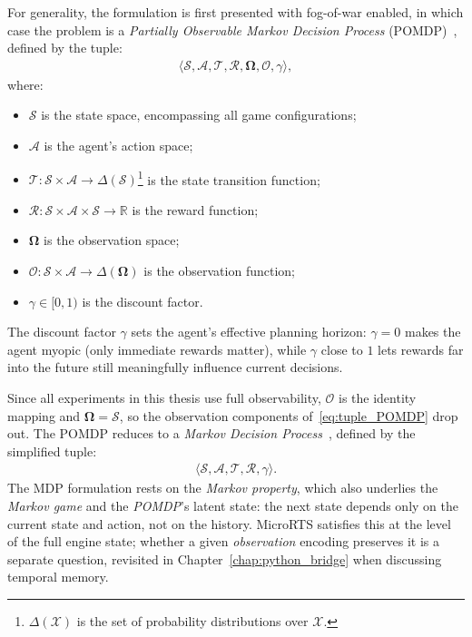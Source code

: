 For generality, the formulation is first presented with fog-of-war enabled, in which case the problem is a \emph{Partially Observable Markov Decision Process} (POMDP)~\cite{kaelblingPlanningActingPartially1998, suttonReinforcementLearningIntroduction2020}, defined by the tuple:
\begin{align}
\langle \mathcal{S}, \mathcal{A}, \mathcal{T}, \mathcal{R}, \boldsymbol{\Omega}, \mathcal{O}, \gamma \rangle,
\label{eq:tuple_POMDP}
\end{align}
where:
\begin{itemize}
    \item $\mathcal{S}$ is the state space, encompassing all game configurations;
    \item $\mathcal{A}$ is the agent's action space;
    \item $\mathcal{T}: \mathcal{S} \times \mathcal{A} \to \Delta(\mathcal{S})$\footnote{$\Delta(\mathcal{X})$ is the set of probability distributions over $\mathcal{X}$.} is the state transition function;
    \item $\mathcal{R}: \mathcal{S} \times \mathcal{A} \times \mathcal{S} \to \mathbb{R}$ is the reward function;
    \item $\boldsymbol{\Omega}$ is the observation space;
    \item $\mathcal{O}: \mathcal{S} \times \mathcal{A} \to \Delta(\boldsymbol{\Omega})$ is the observation function;
    \item $\gamma \in [0,1)$ is the discount factor.
\end{itemize}

The discount factor $\gamma$ sets the agent's effective planning horizon: $\gamma = 0$ makes the agent myopic (only immediate rewards matter), while $\gamma$ close to $1$ lets rewards far into the future still meaningfully influence current decisions.

\medskip

Since all experiments in this thesis use full observability, $\mathcal{O}$ is the identity mapping and $\boldsymbol{\Omega} = \mathcal{S}$, so the observation components of~\ref{eq:tuple_POMDP} drop out. The POMDP reduces to a \emph{Markov Decision Process}~\cite{putermanMarkovDecisionProcesses1994}, defined by the simplified tuple:
\begin{align}
\langle \mathcal{S}, \mathcal{A}, \mathcal{T}, \mathcal{R}, \gamma \rangle.
\label{eq:tuple_MDP}
\end{align}
The MDP formulation rests on the \emph{Markov property}, which also underlies the \emph{Markov game} and the \emph{POMDP}'s latent state: the next state depends only on the current state and action, not on the history. MicroRTS satisfies this at the level of the full engine state; whether a given \emph{observation} encoding preserves it is a separate question, revisited in Chapter~\ref{chap:python_bridge} when discussing temporal memory.

